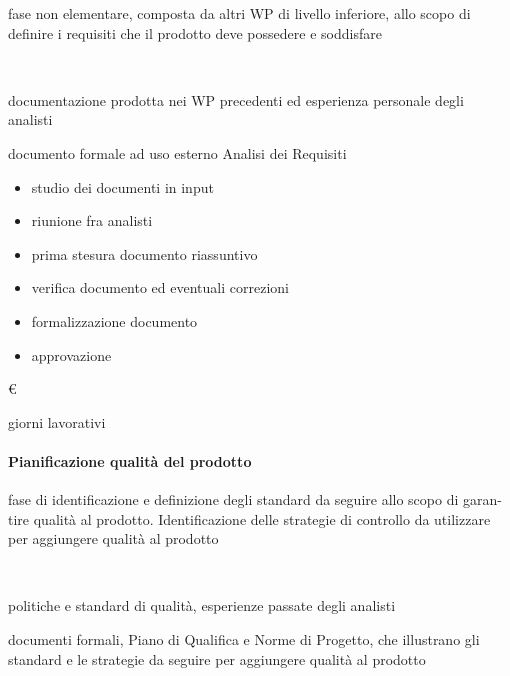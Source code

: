 \item[Descrizione:] fase non elementare, composta da altri WP di livello inferiore, allo scopo di definire i requisiti che il prodotto deve possedere e soddisfare\\

\item[Responsabile:] \\

\item[Input:] documentazione prodotta nei WP precedenti ed esperienza personale degli
analisti\\

\item[Output:] documento formale ad uso esterno Analisi dei Requisiti\\

\item[Attività:]
\begin{itemize}
\item studio dei documenti in input
\item riunione fra analisti
\item prima stesura documento riassuntivo
\item verifica documento ed eventuali correzioni
\item formalizzazione documento
\item approvazione
\end{itemize}
\item[Costo:] \euro \\
\item[Tempi di realizzazione:]  giorni lavorativi


\paragraph{Pianificazione qualità del prodotto}

\item[Descrizione:] fase di identificazione e definizione degli standard da seguire allo scopo di garan-
tire qualità al prodotto. Identificazione delle strategie di controllo da utilizzare per
aggiungere qualità al prodotto\\

\item[Responsabile:]  \\

\item[Input:] politiche e standard di qualità, esperienze passate degli analisti
\item[Output:] documenti formali, Piano di Qualifica e Norme di Progetto, che illustrano gli
standard e le strategie da seguire per aggiungere qualità al prodotto\\

